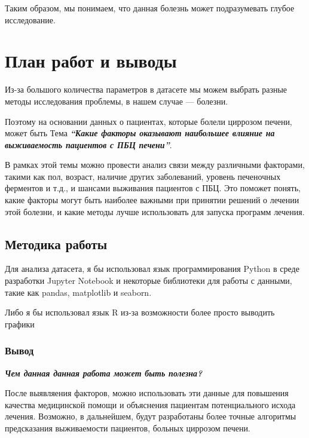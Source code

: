 \documentclass[
  11pt,
]{article}
\begin{document}
Таким образом, мы понимаем, что данная болезнь может подразумевать
глубое исследование.

\hypertarget{ux43fux43bux430ux43d-ux440ux430ux431ux43eux442-ux438-ux432ux44bux432ux43eux434ux44b}{%
\section{План работ и
выводы}\label{ux43fux43bux430ux43d-ux440ux430ux431ux43eux442-ux438-ux432ux44bux432ux43eux434ux44b}}

Из-за большого количества параметров в датасете мы можем выбрать разные
методы исследования проблемы, в нашем случае --- болезни.

Поэтому на основании данных о пациентах, которые болели циррозом печени,
может быть Тема \textbf{\emph{``Какие факторы оказывают наибольшее
влияние на выживаемость пациентов с ПБЦ печени''}}.

В рамках этой темы можно провести анализ связи между различными
факторами, такими как пол, возраст, наличие других заболеваний, уровень
печеночных ферментов и т.д., и шансами выживания пациентов с ПБЦ. Это
поможет понять, какие факторы могут быть наиболее важными при принятии
решений о лечении этой болезни, и какие методы лучше использовать для
запуска программ лечения.

\hypertarget{ux43cux435ux442ux43eux434ux438ux43aux430-ux440ux430ux431ux43eux442ux44b}{%
\subsection{Методика
работы}\label{ux43cux435ux442ux43eux434ux438ux43aux430-ux440ux430ux431ux43eux442ux44b}}

Для анализа датасета, я бы использовал язык программирования Python в
среде разработки Jupyter Notebook и некоторые библиотеки для работы с
данными, такие как pandas, matplotlib и seaborn.

Либо я бы использовал язык R из-за возможности более просто выводить
графики

\hypertarget{ux432ux44bux432ux43eux434}{%
\subsubsection{Вывод}\label{ux432ux44bux432ux43eux434}}

\textbf{\emph{Чем данная данная работа может быть полезна?}}

После выявляения факторов, можно использовать эти данные для повышения
качества медицинской помощи и объяснения пациентам потенциального исхода
лечения. Возможно, в дальнейшем, будут разработаны более точные
алгоритмы предсказания выживаемости пациентов, больных циррозом печени.
\end{document}

